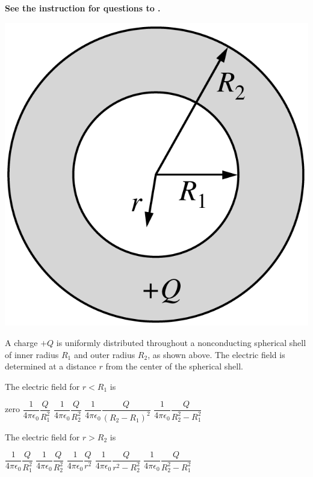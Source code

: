 \textbf{See the instruction for questions  to .}

\begin{center}
\includegraphics[scale=0.2]{images/img-007-008.png}
\end{center}

A charge $+Q$ is uniformly distributed throughout a nonconducting spherical shell of inner radius $R_{1}$ and outer radius $R_{2}$, as shown above. The electric field is determined at a distance $r$ from the center of the spherical shell.

\begin{questions}\setcounter{question}{11}\question
The electric field for $r<R_{1}$ is

\begin{oneparchoices}
\choice zero
\choice $\dfrac{1}{4 \pi \epsilon_{0}} \dfrac{Q}{R_{1}^{2}}$
\choice $\dfrac{1}{4 \pi \epsilon_{0}} \dfrac{Q}{R_{2}^{2}}$
\choice $\dfrac{1}{4 \pi \epsilon_{0}} \dfrac{Q}{\left(R_{2}-R_{1}\right)^{2}}$
\choice $\dfrac{1}{4 \pi \epsilon_{0}} \dfrac{Q}{R_{2}^{2}-R_{1}^{2}}$
\end{oneparchoices}\end{questions}

\begin{questions}\setcounter{question}{12}\question
The electric field for $r>R_{2}$ is

\begin{oneparchoices}
\choice $\dfrac{1}{4 \pi \epsilon_{0}} \dfrac{Q}{R_{1}^{2}}$
\choice $\dfrac{1}{4 \pi \epsilon_{0}} \dfrac{Q}{R_{2}^{2}}$
\choice $\dfrac{1}{4 \pi \epsilon_{0}} \dfrac{Q}{r^{2}}$
\choice $\dfrac{1}{4 \pi \epsilon_{0}} \dfrac{Q}{r^{2}-R_{2}^{2}}$
\choice $\dfrac{1}{4 \pi \epsilon_{0}} \dfrac{Q}{R_{2}^{2}-R_{1}^{2}}$
\end{oneparchoices}\end{questions}

